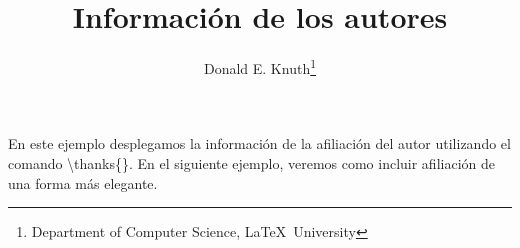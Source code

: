 \documentclass[10pt,letterpaper]{article}
\title{Información de los autores}
\author{Donald E. Knuth\thanks{Department of Computer Science, \LaTeX\ University}}
\date{}
\begin{document}
\maketitle
En este ejemplo desplegamos la información de la afiliación del autor utilizando el comando \textbackslash thanks\{\}. En el siguiente ejemplo, veremos como incluir afiliación de una forma más elegante.
\end{document}
